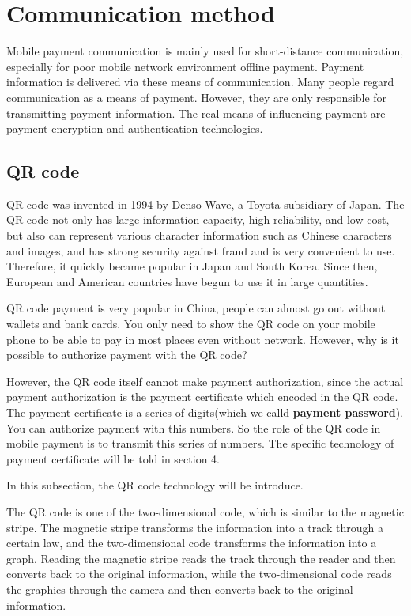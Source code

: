 \documentclass[journal]{IEEEtran}
\begin{document}
\section{Communication method}
Mobile payment communication is mainly used for short-distance communication, especially for poor mobile network environment offline payment. Payment information is delivered via these means of communication. Many people regard communication as a means of payment. However, they are only responsible for transmitting payment information. The real means of influencing payment are payment encryption and authentication technologies.
\subsection{QR code}
QR code was invented in 1994 by Denso Wave, a Toyota subsidiary of Japan. The QR code not only has large information capacity, high reliability, and low cost, but also can represent various character information such as Chinese characters and images, and has strong security against fraud and is very convenient to use. Therefore, it quickly became popular in Japan and South Korea. Since then, European and American countries have begun to use it in large quantities. 

QR code payment is very popular in China, people can almost go out without wallets and bank cards. You only need to show the QR code on your mobile phone to be able to pay in most places even without network. However, why is it possible to authorize payment with the QR code?

However, the QR code itself cannot make payment authorization, since the actual payment authorization is the payment certificate which encoded in the QR code. The payment certificate is a series of digits(which we calld \textbf{payment password}). You can authorize payment with this numbers. So the role of the QR code in mobile payment is to transmit this series of numbers. The specific technology of payment certificate will be told in section 4.

In this subsection, the QR code technology will be introduce.

The QR code is one of the two-dimensional code, which is similar to the magnetic stripe. The magnetic stripe transforms the information into a track through a certain law, and the two-dimensional code transforms the information into a graph. Reading the magnetic stripe reads the track through the reader and then converts back to the original information, while the two-dimensional code reads the graphics through the camera and then converts back to the original information.
\end{document}
